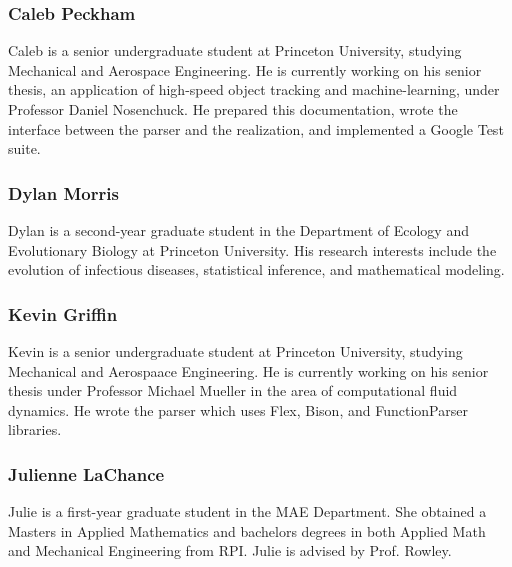 \subsubsection*{Caleb Peckham}

Caleb is a senior undergraduate student at Princeton University, studying Mechanical and Aerospace Engineering. He is currently working on his senior thesis, an application of high-\/speed object tracking and machine-\/learning, under Professor Daniel Nosenchuck. He prepared this documentation, wrote the interface between the parser and the realization, and implemented a Google Test suite.

\subsubsection*{Dylan Morris}

Dylan is a second-\/year graduate student in the Department of Ecology and Evolutionary Biology at Princeton University. His research interests include the evolution of infectious diseases, statistical inference, and mathematical modeling.

\subsubsection*{Kevin Griffin}

Kevin is a senior undergraduate student at Princeton University, studying Mechanical and Aerospaace Engineering. He is currently working on his senior thesis under Professor Michael Mueller in the area of computational fluid dynamics. He wrote the parser which uses Flex, Bison, and Function\+Parser libraries.

\subsubsection*{Julienne La\+Chance}

Julie is a first-\/year graduate student in the M\+AE Department. She obtained a Master\textquotesingle{}s in Applied Mathematics and bachelors degrees in both Applied Math and Mechanical Engineering from R\+PI. Julie is advised by Prof. Rowley. 